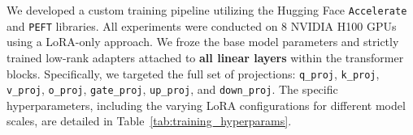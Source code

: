\documentclass[11pt]{article}
\theoremstyle{plain}
\begin{document}
We developed a custom training pipeline utilizing the Hugging Face \texttt{Accelerate} and \texttt{PEFT} libraries. All experiments were conducted on 8 NVIDIA H100 GPUs using a LoRA-only approach. We froze the base model parameters and strictly trained low-rank adapters attached to \textbf{all linear layers} within the transformer blocks. 
Specifically, we targeted the full set of projections: \texttt{q\_proj}, \texttt{k\_proj}, \texttt{v\_proj}, \texttt{o\_proj}, \texttt{gate\_proj}, \texttt{up\_proj}, and \texttt{down\_proj}. 
The specific hyperparameters, including the varying LoRA configurations for different model scales, are detailed in Table~\ref{tab:training_hyperparams}.

\end{document}
